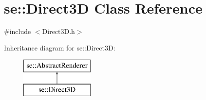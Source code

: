 \hypertarget{classse_1_1_direct3_d}{}\section{se\+:\+:Direct3D Class Reference}
\label{classse_1_1_direct3_d}


{\ttfamily \#include $<$Direct3\+D.\+h$>$}

Inheritance diagram for se\+:\+:Direct3D\+:\begin{figure}[H]
\begin{center}
\leavevmode
\includegraphics[height=2.000000cm]{classse_1_1_direct3_d}
\end{center}
\end{figure}
